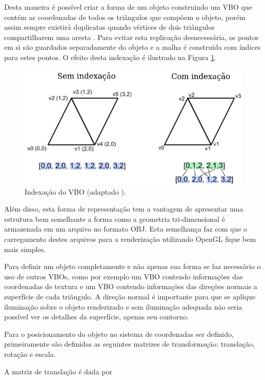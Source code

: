 {Desta maneira é possível criar a forma de um objeto construindo um VBO que contém as coordenadas de todos os triângulos que compõem o objeto, porém assim sempre existirá duplicatas quando vértices de dois triângulos compartilharem uma aresta \cite{openGlTutorial}. Para evitar esta replicação desnecessária, os pontos em si são guardados separadamente do objeto e a malha é construída com índices para estes pontos. O efeito desta indexação é ilustrado na Figura \ref{fig:VBO}.

\begin{figure}[h!]
\centering
\includegraphics[width=.5\linewidth]{figs/TG_VBO_index_pt.png}
\caption{Indexação do VBO (adaptado \cite{openGlTutorial}).}
\label{fig:VBO}
\end{figure}

Além disso, esta forma de representação tem a  vantagem de apresentar uma estrutura bem semelhante a forma como a geometria tri-dimensional  é armazenada em um arquivo no formato OBJ. Esta semelhança faz com que o carregamento destes arquivos para a renderização utilizando OpenGL fique bem mais simples.

Para definir um objeto completamente e não apenas sua forma se faz necessário o uso de outros VBOs, como por exemplo um VBO contendo informações das coordenadas de textura e um VBO contendo informações das direções normais a superfície de cada triângulo. A direção normal é importante para que se aplique iluminação sobre o objeto renderizado e sem iluminação adequada não seria possível ver os detalhes da superfície, apenas seu contorno.


Para o posicionamento do objeto no sistema de coordenadas ser definido, primeiramente são definidas as seguintes matrizes de transformação: translação, rotação e escala.

A matriz de translação é dada por

}
